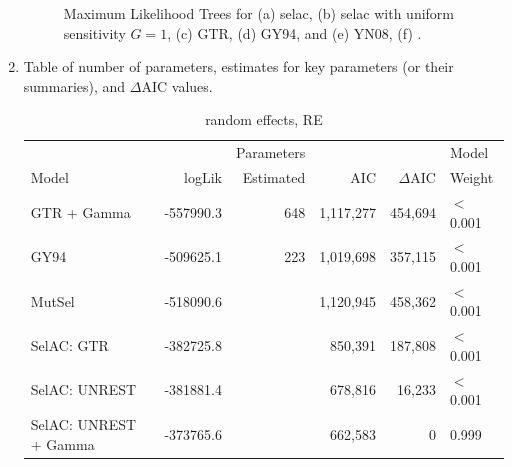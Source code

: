 \documentclass{article}
\newcommand{\DeltaAIC}{\ensuremath{\Delta\text{AIC}}\xspace}
\begin{document}
\begin{enumerate}
\begin{figure}[H]
  \qquad
  \qquad
  \caption{Maximum Likelihood Trees for (a) selac, (b) selac with uniform sensitivity $G = 1$, (c) GTR, (d) GY94, and (e) YN08, (f) \citet{LartillotAndPhilippe2004}.}
  \label{fig:MleTrees}
\end{figure}
\item Table of number of parameters, estimates for key parameters (or their summaries), and \DeltaAIC values.
\begin{table}
\begin{tabular}{lrrrrl}
                        &          &Parameters &          &        & Model\\
  Model                 & logLik   & Estimated &     AIC& \DeltaAIC&  Weight\\\hline
  GTR + Gamma           & -557990.3&        648& 1,117,277& 454,694&$<$0.001\\
  GY94                  & -509625.1&        223& 1,019,698& 357,115&$<$0.001\\
  MutSel                & -518090.6&           & 1,120,945& 458,362&$<$0.001\\
  SelAC: GTR            & -382725.8&           &   850,391& 187,808&$<$0.001\\
  SelAC: UNREST         & -381881.4&           &   678,816&  16,233&$<$0.001\\
  SelAC: UNREST + Gamma & -373765.6&           &   662,583&       0& 0.999
\end{tabular}
\caption{random effects, RE}
\end{table}


\end{enumerate}
\end{document}
